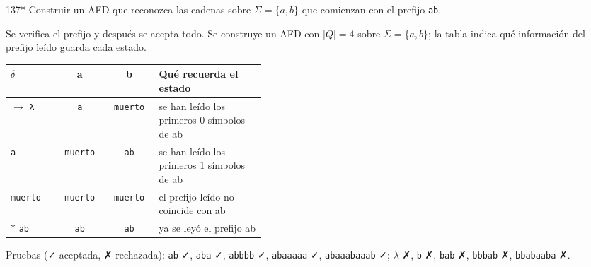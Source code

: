 \documentclass[11pt]{article}
\begin{document}
\begin{ejercicio}{137}{*}
Construir un AFD que reconozca las cadenas sobre $\Sigma = \{a, b\}$ que comienzan con el prefijo \texttt{ab}.
\end{ejercicio}
\proc Se verifica el prefijo y después se acepta todo. Se construye un AFD con $|Q| = 4$ sobre $\Sigma = \{a, b\}$; la tabla indica qué información del prefijo leído guarda cada estado.
\begin{center}\small\begin{tabular}{lccp{0.42\linewidth}}\toprule
$\delta$ & a & b & Qué recuerda el estado \\\midrule
$\to$ \texttt{λ} & \texttt{a} & \texttt{muerto} & se han leído los primeros 0 símbolos de ab \\
 \texttt{a} & \texttt{muerto} & \texttt{ab} & se han leído los primeros 1 símbolos de ab \\
 \texttt{muerto} & \texttt{muerto} & \texttt{muerto} & el prefijo leído no coincide con ab \\
$*$ \texttt{ab} & \texttt{ab} & \texttt{ab} & ya se leyó el prefijo ab \\
\bottomrule\end{tabular}\end{center}
Pruebas (✓ aceptada, ✗ rechazada): \texttt{ab} ✓, \texttt{aba} ✓, \texttt{abbbb} ✓, \texttt{abaaaaa} ✓, \texttt{abaaabaaab} ✓; $\lambda$ ✗, \texttt{b} ✗, \texttt{bab} ✗, \texttt{bbbab} ✗, \texttt{bbabaaba} ✗.
\end{document}
